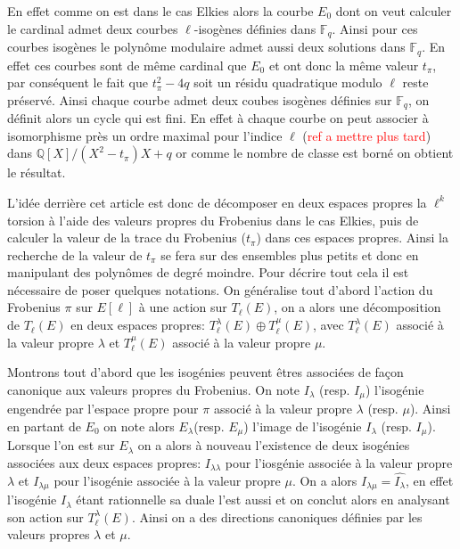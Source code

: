 \documentclass[10pt,a4paper]{book}
\theoremstyle{plain}
\theoremstyle{definition}
\theoremstyle{definition}
\theoremstyle{definition}
\theoremstyle{definition}
\theoremstyle{remark}
\theoremstyle{remark}
\theoremstyle{definition}
\begin{document}
En effet comme on est dans le cas Elkies alors la courbe $E_0$ dont on veut calculer le cardinal admet deux  courbes $\ell$-isogènes définies dans $\mathbb{F}_q$. Ainsi pour ces courbes isogènes le polynôme modulaire admet aussi deux solutions  dans $\mathbb{F}_q$. En effet ces courbes sont de même cardinal que $E_0$ et ont donc la même valeur $t_{\pi}$, par conséquent le fait que $t_{\pi}^2-4q$ soit un résidu quadratique modulo $\ell$ reste préservé. Ainsi chaque courbe admet deux coubes isogènes définies sur $\mathbb{F}_q$, on définit alors un cycle qui est fini. En effet à chaque courbe on peut associer à isomorphisme près un ordre maximal pour l'indice $\ell$ (\textcolor{red}{ref a mettre plus tard}) dans $\mathbb{Q}[X]/(X^2-t_{\pi})X+q$ or comme le nombre de classe est borné on obtient le résultat. 

L'idée derrière cet article est donc de décomposer en deux espaces propres la $\ell^k$ torsion à l'aide des valeurs propres du Frobenius dans le cas Elkies, puis de calculer la valeur de la trace du Frobenius ($t_{\pi}$) dans ces espaces propres. Ainsi la recherche de la valeur de $t_{\pi}$ se fera sur des ensembles plus petits et donc en manipulant des polynômes de degré moindre. Pour décrire tout cela il est nécessaire de poser quelques notations. On généralise tout d'abord l'action du Frobenius $\pi$ sur $E[\ell]$ à une action sur $T_{\ell}(E)$, on a alors une décomposition de $T_{\ell}(E)$ en deux espaces propres: $T_{\ell}^{\lambda}(E) \oplus T_{\ell}^{\mu}(E)$, avec $T_{\ell}^{\lambda}(E)$ associé à la valeur propre $\lambda$ et $T_{\ell}^{\mu}(E)$ associé à la valeur propre $\mu$. 


Montrons tout d'abord que les isogénies peuvent êtres associées de façon canonique aux valeurs propres du Frobenius. On note $I_{\lambda}$ (resp. $I_{\mu}$) l'isogénie engendrée par l'espace propre pour $\pi$ associé à la valeur propre $\lambda$ (resp. $\mu$). Ainsi en partant de $E_0$ on note alors $E_{\lambda}$(resp. $E_{\mu}$) l'image de l'isogénie $I_{\lambda}$ (resp. $I_{\mu}$). Lorsque l'on est sur $E_{\lambda}$ on a alors à nouveau l'existence de deux isogénies associées aux deux espaces propres: $I_{\lambda \lambda}$ pour l'iosgénie associée à la valeur propre $\lambda$ et $I_{\lambda \mu}$ pour l'isogénie associée à la valeur propre $\mu$. On a alors $I_{\lambda \mu}=\widehat{I_{\lambda}}$, en effet l'isogénie $I_{\lambda}$ étant rationnelle sa duale l'est aussi et on conclut alors en analysant son action sur $T_{\ell}^{\lambda}(E)$. Ainsi on a des directions canoniques définies par les valeurs propres $\lambda$ et $\mu$. 
\end{document}
